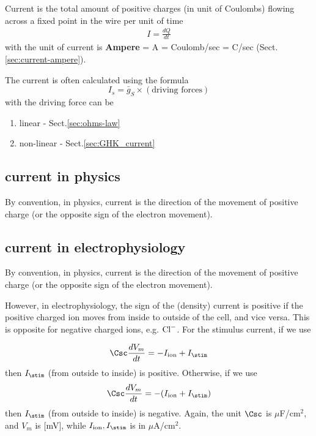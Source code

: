 Current is the total amount of positive charges (in unit of Coulombs) flowing
across a fixed point in the wire per unit of time
\begin{eqnarray}
  \label{eq:409}
  I = \frac{dQ}{dt}
\end{eqnarray}
with the unit of current is {\bf Ampere} = A = Coulomb/sec = C/sec
(Sect.\ref{sec:current-ampere}).

The current is often calculated using the formula
\begin{equation}
I_s = \bar{g}_S \times \left(  \text{driving forces} \right)
\end{equation}
with the driving force can be
\begin{enumerate}
  \item linear - Sect.\ref{sec:ohms-law}
  
  \item non-linear - Sect.\ref{sec:GHK_current}
\end{enumerate}

\subsection{current in physics}
\label{sec:current-in-physics}

By convention, in physics, current is the direction of the movement of positive
charge (or the opposite sign of the electron movement).

\subsection{current in electrophysiology}
\label{sec:current-in-electropysiology}
\label{sec:ionic-currents}

By convention, in physics, current is the direction of the movement
of positive charge (or the opposite sign of the electron movement). 

However, in electrophysiology, the sign of the (density) current is positive if
the positive charged ion moves from inside to outside of the cell, and vice
versa. This is opposite for negative charged ions, e.g. ${\text{Cl}^{-}}$. For the stimulus
current, if we use

\begin{equation}
  \label{eq:1365}
  \Csc \frac{dV_m}{dt}=-I_\ion + I_\stim
\end{equation}
then $I_\stim$ (from outside to inside) is positive. Otherwise, if we
use
\begin{equation}
  \label{eq:1366}
  \Csc \frac{dV_m}{dt}=-(I_\ion + I_\stim)
\end{equation}
then $I_\stim$ (from outside to inside) is negative. Again, the unit
$\Csc$ is $\mu$F/cm$^2$, and $V_m$ is [mV], while $I_\ion, I_\stim$ is
in $\mu$A/cm$^2$. 

